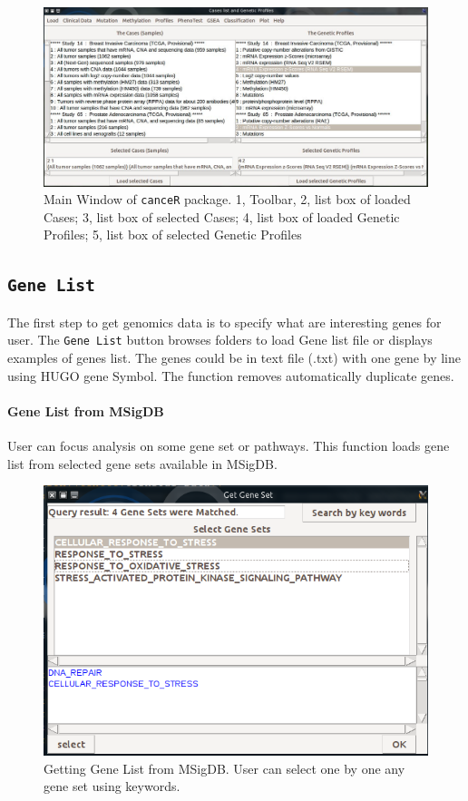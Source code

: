 \documentclass[a4paper]{article}
\begin{document}
\begin{figure}[!ht]
 \centering
\includegraphics[scale=2]{image/mainWindow.png}
\caption{Main Window of \texttt{canceR} package. 1, Toolbar, 2, list box of loaded Cases; 3, list box of selected Cases; 4, list box of loaded Genetic Profiles; 5, list box of selected Genetic Profiles }
\label{Fig3}
\end{figure}


\subsection{\texttt{Gene List}}
The first step to get genomics data is to specify what are interesting genes for user. The \texttt{Gene List} button browses folders to load Gene list file or displays examples of genes list. The genes could be in text file (.txt) with one gene by line using HUGO gene Symbol. The function removes automatically duplicate genes.
\paragraph{Gene List from MSigDB} User can focus  analysis on some gene set or pathways. This function loads gene list from selected gene sets available in MSigDB. 

\begin{figure}[!ht]
 \centering
\includegraphics[scale=0.7]{image/GeneListFromMSigDB.png}
\caption{ Getting Gene List from MSigDB. User can select one by one any gene set using keywords. }
\label{GeneListFromMSigDB}
\end{figure}
\end{document}
